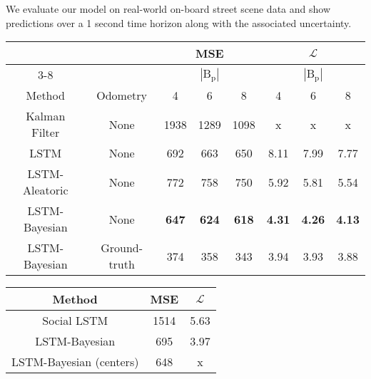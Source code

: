 We evaluate our model on real-world on-board street scene data and show predictions over a 1 second time horizon along with the associated uncertainty.

\begin{table*}[t]
\centering
\setlength\tabcolsep{4pt}
\begin{minipage}{0.67\textwidth}
\centering

\begin{tabular}{cccccccc}
\toprule
&& \multicolumn{3}{c}{MSE} & \multicolumn{3}{c}{$\operatorname{\mathcal{L}}$} \\
\cmidrule{3-8}
&& \multicolumn{3}{c}{$| \text{B}_{\text{p}}|$} & \multicolumn{3}{c}{$| \text{B}_{\text{p}}|$} \\
 Method & Odometry & 4 & 6 & 8 & 4 & 6 & 8 \\
\midrule
Kalman Filter & None & 1938 & 1289 & 1098 & x & x & x \\ 
LSTM & None & 692 & 663 & 650 & 8.11 & 7.99 & 7.77 \\
LSTM-Aleatoric & None & 772 & 758 & 750 & 5.92 & 5.81 & 5.54 \\
LSTM-Bayesian & None & \textbf{647} & \textbf{624} & \textbf{618} & \textbf{4.31} & \textbf{4.26} & \textbf{4.13} \\
\midrule
LSTM-Bayesian & Ground-truth & 374 & 358 & 343 & 3.94 & 3.93 & 3.88\\ 
\bottomrule
\end{tabular}
\caption{Bounding box prediction error with varying $| \text{B}_{p}|$.}
\label{tab:stream1eval}
\end{minipage}%
\hfill
\begin{minipage}{0.32\textwidth}
\centering
\begin{tabular}{ccc}
\toprule
Method &  MSE & $\operatorname{\mathcal{L}}$\\
\midrule
Social LSTM \cite{alahi2016social} & 1514 & 5.63 \\
LSTM-Bayesian & 695 & 3.97 \\
LSTM-Bayesian (centers) & 648 & x \\
\bottomrule
\end{tabular}
\caption{Bounding box center prediction error.}
\label{tab:bboxcenter}
\end{minipage}
\end{table*}

